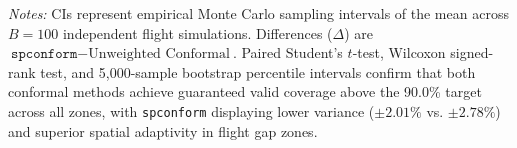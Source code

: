 \begin{table}[t!]
\begin{tabular}{lcccccc}
\bottomrule
\end{tabular}
\begin{minipage}{\textwidth}
\vspace{4pt}
\footnotesize
\textit{Notes:} CIs represent empirical Monte Carlo sampling intervals of the mean across $B = 100$ independent flight simulations. Differences ($\Delta$) are $\texttt{spconform} - \text{Unweighted Conformal}$. Paired Student's $t$-test, Wilcoxon signed-rank test, and 5,000-sample bootstrap percentile intervals confirm that both conformal methods achieve guaranteed valid coverage above the 90.0\% target across all zones, with \texttt{spconform} displaying lower variance ($\pm 2.01\%$ vs. $\pm 2.78\%$) and superior spatial adaptivity in flight gap zones.
\end{minipage}
\end{table}
